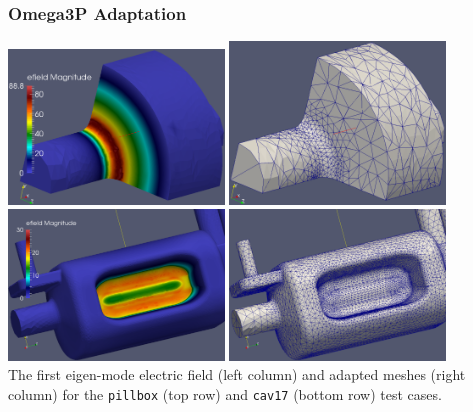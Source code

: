 \documentclass{beamer}
\begin{document}
\begin{frame}
  \frametitle{Omega3P Adaptation}
  \centering
  \includegraphics[width=0.43\textwidth]{../imp/figures/omega3p/pillbox_al_3_ar_0p0125_14221_elems_e_field.eps}
  \includegraphics[width=0.43\textwidth]{../imp/figures/omega3p/pillbox_al_3_ar_0p0125_14221_elems_mesh.eps}\\
  \includegraphics[width=0.43\textwidth]{../imp/figures/omega3p/cav17_al_3_ar_0p0125_386896_elems_e_field.eps}
  \includegraphics[width=0.43\textwidth]{../imp/figures/omega3p/cav17_al_3_ar_0p0125_386896_elems_mesh.eps}\\
  \small
    The first eigen-mode electric field (left column) and adapted meshes
    (right column) for the \texttt{pillbox} (top row) and \texttt{cav17}
    (bottom row) test cases.
\end{frame}
\end{document}
